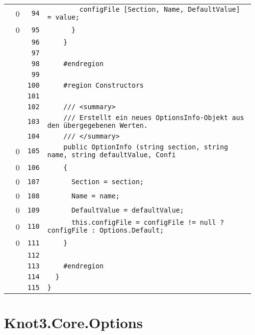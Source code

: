 \documentclass[a4paper,10pt]{article}
\begin{document}
\begin{longtable}[l]{lrrl}
\cellcolor{red} & 0 & \verb~94~ & \verb~        configFile [Section, Name, DefaultValue] = value;~\\
\cellcolor{red} & 0 & \verb~95~ & \verb~      }~\\
\cellcolor{gray} &  & \verb~96~ & \verb~    }~\\
\cellcolor{gray} &  & \verb~97~ & \verb~~\\
\cellcolor{gray} &  & \verb~98~ & \verb~    #endregion~\\
\cellcolor{gray} &  & \verb~99~ & \verb~~\\
\cellcolor{gray} &  & \verb~100~ & \verb~    #region Constructors~\\
\cellcolor{gray} &  & \verb~101~ & \verb~~\\
\cellcolor{gray} &  & \verb~102~ & \verb~    /// <summary>~\\
\cellcolor{gray} &  & \verb~103~ & \verb~    /// Erstellt ein neues OptionsInfo-Objekt aus den übergegebenen Werten.~\\
\cellcolor{gray} &  & \verb~104~ & \verb~    /// </summary>~\\
\cellcolor{red} & 0 & \verb~105~ & \verb~    public OptionInfo (string section, string name, string defaultValue, Confi~\\
\cellcolor{red} & 0 & \verb~106~ & \verb~    {~\\
\cellcolor{red} & 0 & \verb~107~ & \verb~      Section = section;~\\
\cellcolor{red} & 0 & \verb~108~ & \verb~      Name = name;~\\
\cellcolor{red} & 0 & \verb~109~ & \verb~      DefaultValue = defaultValue;~\\
\cellcolor{red} & 0 & \verb~110~ & \verb~      this.configFile = configFile != null ? configFile : Options.Default;~\\
\cellcolor{red} & 0 & \verb~111~ & \verb~    }~\\
\cellcolor{gray} &  & \verb~112~ & \verb~~\\
\cellcolor{gray} &  & \verb~113~ & \verb~    #endregion~\\
\cellcolor{gray} &  & \verb~114~ & \verb~  }~\\
\cellcolor{gray} &  & \verb~115~ & \verb~}~\\
\end{longtable}
\newpage
\section{Knot3.Core.Options}
\end{document}
